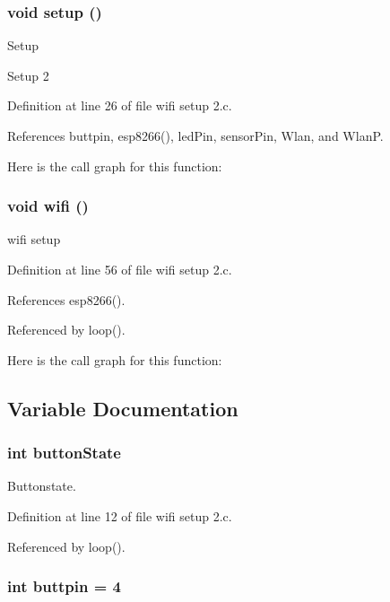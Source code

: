 \subsubsection{\setlength{\rightskip}{0pt plus 5cm}void setup ()}\label{wifi_01setup_012_8c_415266b005d267e801176f27c0434a50}


Setup

Setup 2 

Definition at line 26 of file wifi setup 2.c.

References buttpin, esp8266(), led\-Pin, sensor\-Pin, Wlan, and Wlan\-P.

Here is the call graph for this function:
\subsubsection{\setlength{\rightskip}{0pt plus 5cm}void wifi ()}\label{wifi_01setup_012_8c_d0e9a40529b04928cb2dbd0a723a232f}


wifi setup 

Definition at line 56 of file wifi setup 2.c.

References esp8266().

Referenced by loop().

Here is the call graph for this function:

\subsection{Variable Documentation}
\subsubsection{\setlength{\rightskip}{0pt plus 5cm}int {\bf button\-State}}\label{wifi_01setup_012_8c_1a3b30f592b65e3d67bb202a9b4e5bd5}


Buttonstate. 



Definition at line 12 of file wifi setup 2.c.

Referenced by loop().
\subsubsection{\setlength{\rightskip}{0pt plus 5cm}int {\bf buttpin} = 4}\label{wifi_01setup_012_8c_f1d86e2438724cdc7cde89b4fa5e364a}


